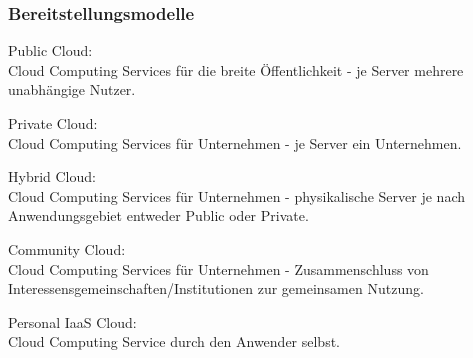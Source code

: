 \documentclass[13pt,a4paper,bibliography=totocnumbered,listof=totocnumbered]{scrartcl}
\begin{document}
\subsubsection{Bereitstellungsmodelle}
\begin{compactitem}
\item Public Cloud:\\
Cloud Computing Services für die breite Öffentlichkeit - je Server mehrere unabhängige Nutzer.
\item Private Cloud:\\
Cloud Computing Services für Unternehmen - je Server ein Unternehmen.
\item Hybrid Cloud:\\
Cloud Computing Services für Unternehmen - physikalische Server je nach Anwendungsgebiet entweder Public oder Private.
\item Community Cloud:\\
Cloud Computing Services für Unternehmen - Zusammenschluss von Interessensgemeinschaften/Institutionen zur gemeinsamen Nutzung.
\item Personal IaaS Cloud:\\
Cloud Computing Service durch den Anwender selbst.
\end{compactitem}

\cite{35} \cite[S. 3]{34}
\end{document}
